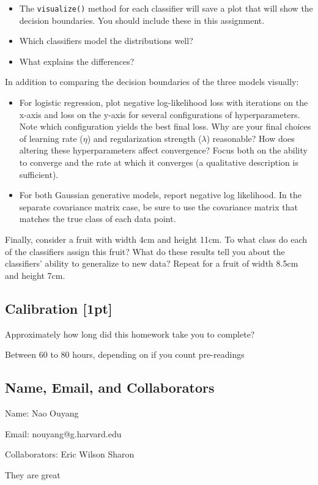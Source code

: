 \documentclass[submit]{harvardml}
\begin{document}
\begin{problem}
\begin{itemize}
\item The \texttt{visualize()} method for each classifier will save a plot that will show the decision boundaries. You should include these in this assignment.
\item Which classifiers model the distributions well?
\item What explains the differences?

\end{itemize}

In addition to comparing the decision boundaries of the three models visually:
\begin{itemize}

\item For logistic regression, plot negative log-likelihood loss with iterations on the x-axis and loss on the y-axis for several configurations of hyperparameters. Note which configuration yields the best final loss. Why are your final choices of learning rate ($\eta$) and regularization strength ($\lambda$) reasonable? How does altering these hyperparameters affect convergence? Focus both on the ability to converge and the rate at which it converges (a qualitative description is sufficient).

\item For both Gaussian generative models, report negative log likelihood. In the separate covariance matrix case, be sure to use the covariance matrix that matches the true class of each data point.

\end{itemize}

Finally, consider a fruit with width 4cm and height 11cm.  To what
class do each of the classifiers assign this fruit? What do these results tell you about the classifiers' ability to generalize to new data?  Repeat
for a fruit of width 8.5cm and height 7cm.

\end{problem}

\newpage
\subsection*{Calibration [1pt]}
Approximately how long did this homework take you to complete?

Between 60 to 80 hours, depending on if you count pre-readings

\subsection*{Name, Email, and Collaborators}

Name: Nao Ouyang

Email: nouyang@g.harvard.edu    

Collaborators:
Eric
Wilson
Sharon

They are great
\end{document}

